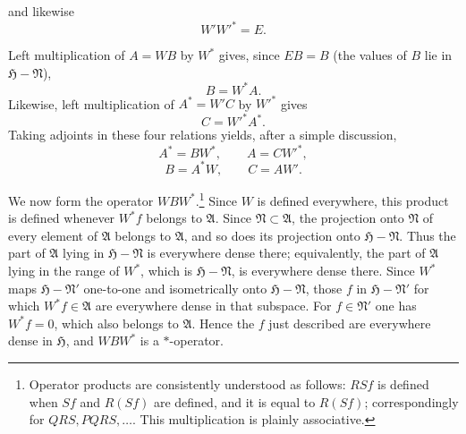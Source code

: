 \documentclass[fontsize=13pt,paper=b5,leqno,bookmarkpackage=false]{scrartcl}
\begin{document}


and likewise
\begin{equation}
  \tag*{\(\circledcirc\)}
  \label{eq:WpWpstar}
  W'W'^{*}=E.
\end{equation}

Left multiplication of \(A=WB\) by \(W^*\) gives, since \(EB=B\)
(the values of \(B\) lie in \(\mathfrak H-\mathfrak N\)),
\begin{equation}
  \tag*{\(*\)}
  \label{eq:star-B}
  B=W^*A.
\end{equation}
Likewise, left multiplication of \(A^*=W'C\) by \(W'^{*}\) gives
\begin{equation}
  \tag*{\(*\)}
  \label{eq:star-C}
  C=W'^{*}A^*.
\end{equation}
Taking adjoints in these four relations yields, after a simple
discussion,
\begin{equation}
  \tag*{\(\#\)}
  \label{eq:hash-adjoints}
  A^*=BW^*,
  \qquad
  A=CW'^{*},
\end{equation}
\begin{equation}
  \tag*{\(\#\)}
  \label{eq:hash-converses}
  B=A^*W,
  \qquad
  C=AW'.
\end{equation}

We now form the operator \(WBW^*\).\footnote{\label{fn:20}%
Operator products are consistently understood as follows: \(RSf\) is
defined when \(Sf\) and \(R(Sf)\) are defined, and it is equal to
\(R(Sf)\); correspondingly for \(QRS,PQRS,\ldots\).  This multiplication
is plainly associative.}
Since \(W\) is defined everywhere, this product is defined whenever
\(W^*f\) belongs to \(\mathfrak A\).  Since
\(\mathfrak N\subset\mathfrak A\), the projection onto \(\mathfrak N\)
of every element of \(\mathfrak A\) belongs to \(\mathfrak A\), and so
does its projection onto \(\mathfrak H-\mathfrak N\).  Thus the part of
\(\mathfrak A\) lying in \(\mathfrak H-\mathfrak N\) is everywhere
dense there; equivalently, the part of \(\mathfrak A\) lying in the
range of \(W^*\), which is \(\mathfrak H-\mathfrak N\), is everywhere
dense there.  Since \(W^*\) maps
\(\mathfrak H-\mathfrak N'\) one-to-one and isometrically onto
\(\mathfrak H-\mathfrak N\), those \(f\) in
\(\mathfrak H-\mathfrak N'\) for which \(W^*f\in\mathfrak A\) are
everywhere dense in that subspace.  For \(f\in\mathfrak N'\) one has
\(W^*f=0\), which also belongs to \(\mathfrak A\).  Hence the \(f\) just
described are everywhere dense in \(\mathfrak H\), and \(WBW^*\) is a
\(*\)-operator.
\end{document}
